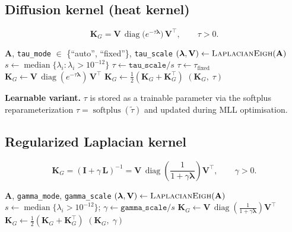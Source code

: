 \documentclass[11pt]{article}
\begin{document}
\subsection{Diffusion kernel (heat kernel)}

\[
\mathbf{K}_G = \mathbf{V}\,\operatorname{diag}\!\bigl(e^{-\tau\bm{\lambda}}\bigr)\,\mathbf{V}^\top,
\qquad \tau > 0.
\]

\begin{algorithm}[H]
\caption{Diffusion kernel}
\begin{algorithmic}[1]
\Require $\mathbf{A}$, \texttt{tau\_mode} $\in$ \{``auto'', ``fixed''\}, \texttt{tau\_scale}
\State $(\bm{\lambda}, \mathbf{V}) \gets \textsc{LaplacianEigh}(\mathbf{A})$
    \State $s \gets \operatorname{median}\{\lambda_i : \lambda_i > 10^{-12}\}$
    \State $\tau \gets \texttt{tau\_scale} / s$
\Else
    \State $\tau \gets \tau_{\mathrm{fixed}}$
\EndIf
\State $\mathbf{K}_G \gets \mathbf{V}\,\operatorname{diag}(e^{-\tau\bm{\lambda}})\,\mathbf{V}^\top$
\State $\mathbf{K}_G \gets \tfrac{1}{2}(\mathbf{K}_G + \mathbf{K}_G^\top)$
\State \Return $(\mathbf{K}_G,\; \tau)$
\end{algorithmic}
\end{algorithm}

\noindent\textbf{Learnable variant.} $\tau$ is stored as a trainable parameter via the
softplus reparameterization $\tau = \operatorname{softplus}(\tilde{\tau})$ and updated
during MLL optimisation.

\subsection{Regularized Laplacian kernel}

\[
\mathbf{K}_G = (\mathbf{I} + \gamma\,\mathbf{L})^{-1}
= \mathbf{V}\,\operatorname{diag}\!\left(\frac{1}{1+\gamma\bm{\lambda}}\right)\mathbf{V}^\top,
\qquad \gamma > 0.
\]

\begin{algorithm}[H]
\caption{Regularized Laplacian kernel}
\begin{algorithmic}[1]
\Require $\mathbf{A}$, \texttt{gamma\_mode}, \texttt{gamma\_scale}
\State $(\bm{\lambda}, \mathbf{V}) \gets \textsc{LaplacianEigh}(\mathbf{A})$
    \State $s \gets \operatorname{median}\{\lambda_i > 10^{-12}\}$;\quad
           $\gamma \gets \texttt{gamma\_scale} / s$
\EndIf
\State $\mathbf{K}_G \gets \mathbf{V}\,\operatorname{diag}\!\left(\tfrac{1}{1+\gamma\bm{\lambda}}\right)\mathbf{V}^\top$
\State $\mathbf{K}_G \gets \tfrac{1}{2}(\mathbf{K}_G + \mathbf{K}_G^\top)$
\State \Return $(\mathbf{K}_G,\; \gamma)$
\end{algorithmic}
\end{algorithm}
\end{document}
